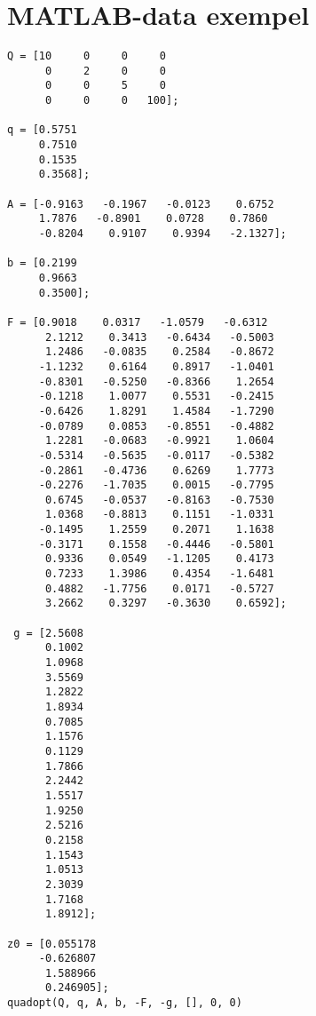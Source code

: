 \newpage

\section{MATLAB-data exempel}

\begin{lstlisting}
Q = [10     0     0     0
      0     2     0     0
      0     0     5     0
      0     0     0   100];
  
q = [0.5751
     0.7510
     0.1535
     0.3568];
 
A = [-0.9163   -0.1967   -0.0123    0.6752
     1.7876   -0.8901    0.0728    0.7860
     -0.8204    0.9107    0.9394   -2.1327];
 
b = [0.2199
     0.9663
     0.3500];

F = [0.9018    0.0317   -1.0579   -0.6312
      2.1212    0.3413   -0.6434   -0.5003
      1.2486   -0.0835    0.2584   -0.8672
     -1.1232    0.6164    0.8917   -1.0401
     -0.8301   -0.5250   -0.8366    1.2654
     -0.1218    1.0077    0.5531   -0.2415
     -0.6426    1.8291    1.4584   -1.7290
     -0.0789    0.0853   -0.8551   -0.4882
      1.2281   -0.0683   -0.9921    1.0604
     -0.5314   -0.5635   -0.0117   -0.5382
     -0.2861   -0.4736    0.6269    1.7773
     -0.2276   -1.7035    0.0015   -0.7795
      0.6745   -0.0537   -0.8163   -0.7530
      1.0368   -0.8813    0.1151   -1.0331
     -0.1495    1.2559    0.2071    1.1638
     -0.3171    0.1558   -0.4446   -0.5801
      0.9336    0.0549   -1.1205    0.4173
      0.7233    1.3986    0.4354   -1.6481
      0.4882   -1.7756    0.0171   -0.5727
      3.2662    0.3297   -0.3630    0.6592];
  
 g = [2.5608
      0.1002
      1.0968
      3.5569
      1.2822
      1.8934
      0.7085
      1.1576
      0.1129
      1.7866
      2.2442
      1.5517
      1.9250
      2.5216
      0.2158
      1.1543
      1.0513
      2.3039
      1.7168
      1.8912];
  
z0 = [0.055178 
     -0.626807 
      1.588966 
      0.246905]; 
quadopt(Q, q, A, b, -F, -g, [], 0, 0)
\end{lstlisting}

